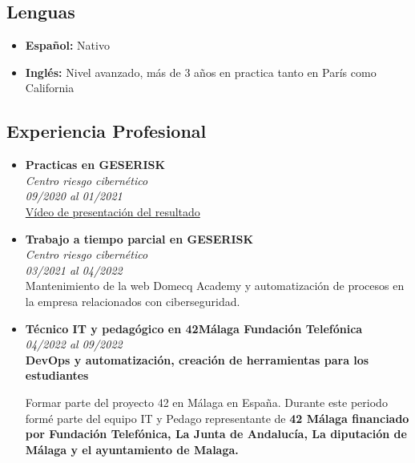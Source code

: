 \documentclass[11pt, oneside, a4paper, titlepage]{article}
\begin{document}
\begin{tcolorbox}
\begin{minipage}[t]{8cm}
\begin{tcolorbox}[grow to
			left by=0.6cm,colback=gray!25,colframe=white]
		\section*{Lenguas} 
			\begin{itemize}
				\item{\textbf{Español:} Nativo}
				\item{\textbf{Inglés:} Nivel avanzado, más de 3 años en practica tanto en París como California}
			\end{itemize}
		\end{tcolorbox} \end{minipage} 
		\begin{minipage}[t]{11cm}
		\vspace*{-0.5cm} 
			\begin{tcolorbox}[grow to right
		by=0.75cm,colframe=white,colback=white] 
				\section{Experiencia Profesional} 

			\begin{itemize} 
				\item { \textbf{Practicas en GESERISK} \\
				\emph{Centro riesgo cibernético} \\ \emph{09/2020 al
				01/2021} \\ 
				\href{https://youtu.be/AlB1oqxZPXA}{Vídeo de
				presentación del resultado}} 
				\item { 
					\textbf{Trabajo a tiempo parcial en GESERISK} \\
					\emph{Centro riesgo cibernético} \\ 
					\emph{03/2021 al 04/2022} \\ 

					Mantenimiento de la web Domecq Academy y
					automatización de procesos en la empresa relacionados con
					ciberseguridad. 
				} 
				\item { 
					\textbf{Técnico IT y pedagógico en 42Málaga Fundación Telefónica} \\ 
					\emph{04/2022 al 09/2022} \\ 
					\textbf{DevOps y automatización, creación de
					herramientas para los estudiantes}

					Formar parte del proyecto 42 en Málaga en España. Durante
					este periodo formé parte del equipo IT y Pedago
					representante de \textbf{42 Málaga financiado por Fundación
					Telefónica, La Junta de Andalucía, La diputación de Málaga y el
					ayuntamiento de Malaga.}
					
}
\end{itemize}
\end{tcolorbox}
\end{minipage}
\end{tcolorbox}
\end{document}
